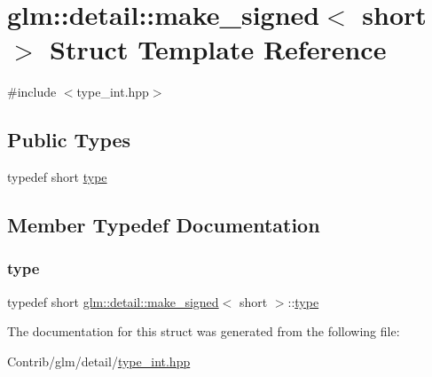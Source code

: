 \hypertarget{structglm_1_1detail_1_1make__signed_3_01short_01_4}{}\section{glm\+:\+:detail\+:\+:make\+\_\+signed$<$ short $>$ Struct Template Reference}
\label{structglm_1_1detail_1_1make__signed_3_01short_01_4}


{\ttfamily \#include $<$type\+\_\+int.\+hpp$>$}

\subsection*{Public Types}
\begin{DoxyCompactItemize}
\item 
typedef short \mbox{\hyperlink{structglm_1_1detail_1_1make__signed_3_01short_01_4_a9488d8ffbd34998675456fa6d1143989}{type}}
\end{DoxyCompactItemize}


\subsection{Member Typedef Documentation}
\mbox{\label{structglm_1_1detail_1_1make__signed_3_01short_01_4_a9488d8ffbd34998675456fa6d1143989}} 
\subsubsection{\texorpdfstring{type}{type}}
{\footnotesize\ttfamily typedef short \mbox{\hyperlink{structglm_1_1detail_1_1make__signed}{glm\+::detail\+::make\+\_\+signed}}$<$ short $>$\+::\mbox{\hyperlink{structglm_1_1detail_1_1make__signed_3_01short_01_4_a9488d8ffbd34998675456fa6d1143989}{type}}}



The documentation for this struct was generated from the following file\+:\begin{DoxyCompactItemize}
\item 
Contrib/glm/detail/\mbox{\hyperlink{type__int_8hpp}{type\+\_\+int.\+hpp}}\end{DoxyCompactItemize}
